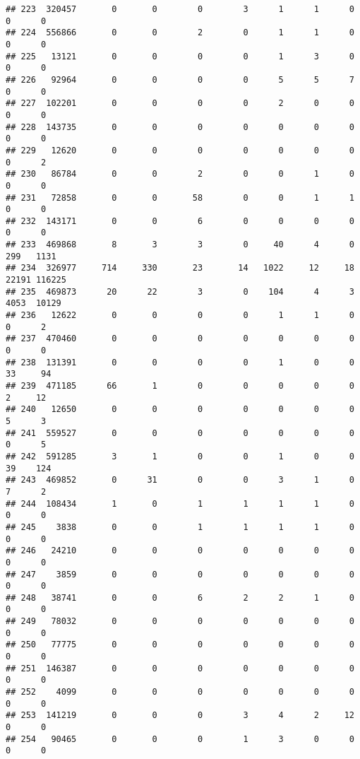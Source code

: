 \documentclass[
]{article}
\begin{document}
\begin{verbatim}
## 223  320457       0       0        0        3      1      1      0     0      0
## 224  556866       0       0        2        0      1      1      0     0      0
## 225   13121       0       0        0        0      1      3      0     0      0
## 226   92964       0       0        0        0      5      5      7     0      0
## 227  102201       0       0        0        0      2      0      0     0      0
## 228  143735       0       0        0        0      0      0      0     0      0
## 229   12620       0       0        0        0      0      0      0     0      2
## 230   86784       0       0        2        0      0      1      0     0      0
## 231   72858       0       0       58        0      0      1      1     0      0
## 232  143171       0       0        6        0      0      0      0     0      0
## 233  469868       8       3        3        0     40      4      0   299   1131
## 234  326977     714     330       23       14   1022     12     18 22191 116225
## 235  469873      20      22        3        0    104      4      3  4053  10129
## 236   12622       0       0        0        0      1      1      0     0      2
## 237  470460       0       0        0        0      0      0      0     0      0
## 238  131391       0       0        0        0      1      0      0    33     94
## 239  471185      66       1        0        0      0      0      0     2     12
## 240   12650       0       0        0        0      0      0      0     5      3
## 241  559527       0       0        0        0      0      0      0     0      5
## 242  591285       3       1        0        0      1      0      0    39    124
## 243  469852       0      31        0        0      3      1      0     7      2
## 244  108434       1       0        1        1      1      1      0     0      0
## 245    3838       0       0        1        1      1      1      0     0      0
## 246   24210       0       0        0        0      0      0      0     0      0
## 247    3859       0       0        0        0      0      0      0     0      0
## 248   38741       0       0        6        2      2      1      0     0      0
## 249   78032       0       0        0        0      0      0      0     0      0
## 250   77775       0       0        0        0      0      0      0     0      0
## 251  146387       0       0        0        0      0      0      0     0      0
## 252    4099       0       0        0        0      0      0      0     0      0
## 253  141219       0       0        0        3      4      2     12     0      0
## 254   90465       0       0        0        1      3      0      0     0      0

\end{verbatim}
\end{document}
